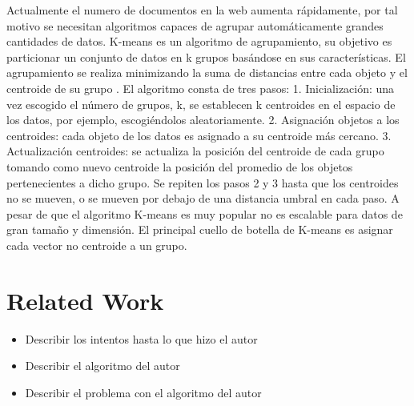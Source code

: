 \documentclass[runningheads]{llncs}
\begin{document}
Actualmente el numero de documentos en la web aumenta rápidamente, por tal motivo se necesitan algoritmos capaces de agrupar automáticamente grandes cantidades de datos.
K-means es un algoritmo de agrupamiento, su objetivo es particionar un conjunto de datos en k grupos basándose en sus características. El agrupamiento se realiza minimizando la suma de distancias entre cada objeto y el centroide de su grupo \cite{ganguly_2018}.
El algoritmo consta de tres pasos:
1.	Inicialización: una vez escogido el número de grupos, k, se establecen k centroides en el espacio de los datos, por ejemplo, escogiéndolos aleatoriamente.
2.	Asignación objetos a los centroides: cada objeto de los datos es asignado a su centroide más cercano.
3.	Actualización centroides: se actualiza la posición del centroide de cada grupo tomando como nuevo centroide la posición del promedio de los objetos pertenecientes a dicho grupo.
Se repiten los pasos 2 y 3 hasta que los centroides no se mueven, o se mueven por debajo de una distancia umbral en cada paso.
A pesar de que el algoritmo K-means es muy popular no es escalable para datos de gran tamaño y dimensión.
El principal cuello de botella de K-means es asignar cada vector no centroide a un grupo.

\section{Related Work}

\begin{itemize}
\item Describir los intentos hasta lo que hizo el autor
\item Describir el algoritmo del autor
\item Describir el problema con el algoritmo del autor
\end{itemize}
\end{document}
